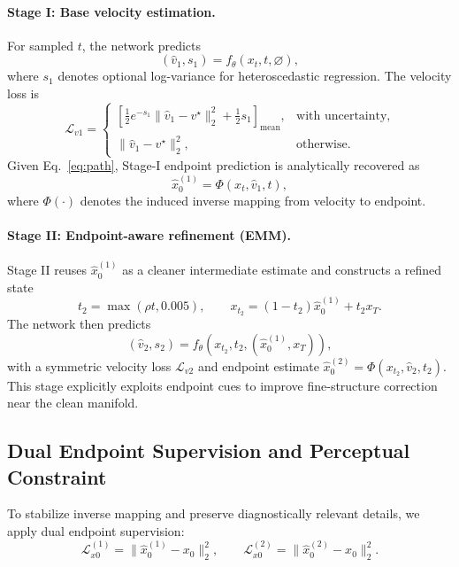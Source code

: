 \paragraph{Stage I: Base velocity estimation.}
For sampled $t$, the network predicts
\begin{equation}
 (\hat v_1,s_1)=f_{\theta}(x_t,t,\varnothing),
\end{equation}
where $s_1$ denotes optional log-variance for heteroscedastic regression. The velocity loss is
\begin{equation}
 \mathcal{L}_{v1}=\begin{cases}
 \left[\frac{1}{2}e^{-s_1}\lVert\hat v_1-v^{\star}\rVert_2^2+\frac{1}{2}s_1\right]_{\text{mean}}, & \text{with uncertainty},\\
 \lVert\hat v_1-v^{\star}\rVert_2^2, & \text{otherwise}.
 \end{cases}
 \label{eq:lv1}
\end{equation}
Given Eq.~\eqref{eq:path}, Stage-I endpoint prediction is analytically recovered as
\begin{equation}
 \hat x_0^{(1)}=\Phi(x_t,\hat v_1,t),
\end{equation}
where $\Phi(\cdot)$ denotes the induced inverse mapping from velocity to endpoint.

\paragraph{Stage II: Endpoint-aware refinement (EMM).}
Stage II reuses $\hat x_0^{(1)}$ as a cleaner intermediate estimate and constructs a refined state
\begin{equation}
 t_2=\max(\rho t,0.005),\qquad x_{t_2}=(1-t_2)\hat x_0^{(1)}+t_2x_T.
\end{equation}
The network then predicts
\begin{equation}
 (\hat v_2,s_2)=f_{\theta}(x_{t_2},t_2,(\hat x_0^{(1)},x_T)),
\end{equation}
with a symmetric velocity loss $\mathcal{L}_{v2}$ and endpoint estimate $\hat x_0^{(2)}=\Phi(x_{t_2},\hat v_2,t_2)$. This stage explicitly exploits endpoint cues to improve fine-structure correction near the clean manifold.

\subsection{Dual Endpoint Supervision and Perceptual Constraint}
\label{subsec:dual_supervision}
To stabilize inverse mapping and preserve diagnostically relevant details, we apply dual endpoint supervision:
\begin{equation}
 \mathcal{L}_{x0}^{(1)}=\lVert\hat x_0^{(1)}-x_0\rVert_2^2,\qquad
 \mathcal{L}_{x0}^{(2)}=\lVert\hat x_0^{(2)}-x_0\rVert_2^2.
\end{equation}

